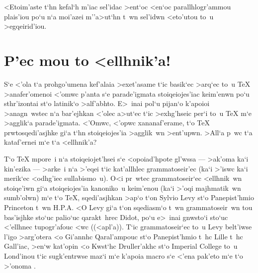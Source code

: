 \exercise <Etoim'aste t`hn kefal`h m'iac sel'idac >ent`oc <en`oc
paral\-lh\-logr'am\-mou plai\-s'i\-ou po`u n`a moi'azei m''\NB{}a>ut`hn
t~wn sel'idwn <eto'utou to~u >egqeirid'iou.


\section{P'ec mou to <ellhnik'a!}


S`e <'ola t`a prohgo'umena kef'alaia >exet'asame t`ic basik`ec >arq`ec
to~u {\rm \TeX} >anafer'omenoi <'omwc p'anta s`e parade'igmata
stoiqeiojes'iac keim'enwn po`u sthr'izontai st`o latinik`o >alf'a\-bhto. 
E>~inai pol`u pijan`o k'apoioi >anagn~wstec n`a bar'ejhkan <'olec
a>ut`ec t`ic >exhg'hseic per`i to~u {\rm \TeX} m`e >agglik`a
parade'igmata.  <'Omwc, <'opwc xananaf'erame, t`o {\rm \TeX}
prwtosqedi'asjhke gi`a t`hn stoiqeiojes'ia >agglik~wn >ent'upwn.  >All`a
p~wc t`a kataf'ernei m`e t`a <ellhnik'a?

T`o {\rm\TeX} mpore~i n`a stoiqeiojet'hsei s`e <opoiad'hpote gl'wssa
--- >ak'oma ka`i kin'ezika --- >arke~i n`a >'eqei t`ic kat'allhlec
grammatoseir'ec (ka`i >'iswc ka`i merik`ec <odhg'iec sullabismo~u).  O<i
pr~wtec grammatoseir`ec <ellhnik~wn stoiqe'iwn gi`a stoiqeiojes'ia
kanoniko~u keim'enou (ka`i >'oqi majhmatik~wn sumb'olwn) m`e t`o {\rm
\TeX}, sqedi'asjhkan >ap`o t`on {\rm Sylvio Levy} st`o Panepist'hmio
{\rm Princeton} t~wn H.P.A\null.  <O {\rm Levy} gi`a t`on sqediasm`o
t~wn grammatoseir~wn tou bas'isjhke sto`uc palio`uc qarakt~hrec {\rm
Didot}, po`u e>~inai gnwsto`i sto`uc <'ellhnec tupogr'afouc <wc
((<apl'a)).  T`ic grammatoseir`ec to~u {\rm Levy} belt'iwse l'igo
>arg'otera <o Gi'annhc Qaral'ampouc st`o Panepist'hmio t~hc {\rm Lille}
t~hc Gall'iac, >en`w kat'opin <o Kwst`hc Druller'akhc st`o {\rm Imperial
College} to~u Lond'inou t`ic sugk'entrwse maz`i m`e k'apoia {\rm macro}
s`e <'ena pak'eto m`e t`o >'onoma \greektex.  

